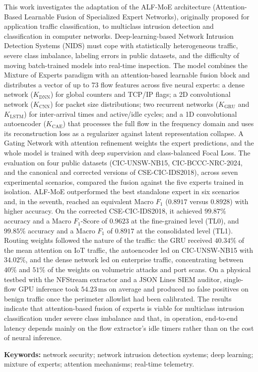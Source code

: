 \documentclass[
	12pt,		%
	a4paper,	%
	openright,  %
	oneside,	%
	chapter=TITLE,		%
	section=TITLE,		%
	english,	%
	brazilian   %
]{abntex2}
\begin{document}
\begin{resumo}[Abstract]
	This work investigates the adaptation of the ALF-MoE architecture (Attention-Based Learnable Fusion of Specialized Expert Networks), originally proposed for application traffic classification, to multiclass intrusion detection and classification in computer networks. Deep-learning-based Network Intrusion Detection Systems (NIDS) must cope with statistically heterogeneous traffic, severe class imbalance, labeling errors in public datasets, and the difficulty of moving batch-trained models into real-time inspection. The model combines the Mixture of Experts paradigm with an attention-based learnable fusion block and distributes a vector of up to 73 flow features across five neural experts: a dense network ($K_{\mathrm{DNN}}$) for global counters and TCP/IP flags; a 2D convolutional network ($K_{\mathrm{CNN}}$) for packet size distributions; two recurrent networks ($K_{\mathrm{GRU}}$ and $K_{\mathrm{LSTM}}$) for inter-arrival times and active/idle cycles; and a 1D convolutional autoencoder ($K_{\mathrm{CAE}}$) that processes the full flow in the frequency domain and uses its reconstruction loss as a regularizer against latent representation collapse. A Gating Network with attention refinement weights the expert predictions, and the whole model is trained with deep supervision and class-balanced Focal Loss. The evaluation on four public datasets (CIC-UNSW-NB15, CIC-BCCC-NRC-2024, and the canonical and corrected versions of CSE-CIC-IDS2018), across seven experimental scenarios, compared the fusion against the five experts trained in isolation. ALF-MoE outperformed the best standalone expert in six scenarios and, in the seventh, reached an equivalent Macro $F_1$ ($0.8917$ versus $0.8928$) with higher accuracy. On the corrected CSE-CIC-IDS2018, it achieved $99.87\%$ accuracy and a Macro $F_1$-Score of $0.9623$ at the fine-grained level (TL0), and $99.85\%$ accuracy and a Macro $F_1$ of $0.8917$ at the consolidated level (TL1). Routing weights followed the nature of the traffic: the GRU received $40.34\%$ of the mean attention on IoT traffic, the autoencoder led on CIC-UNSW-NB15 with $34.02\%$, and the dense network led on enterprise traffic, concentrating between $40\%$ and $51\%$ of the weights on volumetric attacks and port scans. On a physical testbed with the NFStream extractor and a JSON Lines SIEM auditor, single-flow GPU inference took $54.23\,\mathrm{ms}$ on average and produced no false positives on benign traffic once the perimeter allowlist had been calibrated. The results indicate that attention-based fusion of experts is viable for multiclass intrusion classification under severe class imbalance and that, in operation, end-to-end latency depends mainly on the flow extractor's idle timers rather than on the cost of neural inference.

	\vspace*{0.5cm}
	\noindent\textbf{{Keywords: }} network security; network intrusion detection systems; deep learning; mixture of experts; attention mechanisms; real-time telemetry.
\end{resumo}
\end{document}
